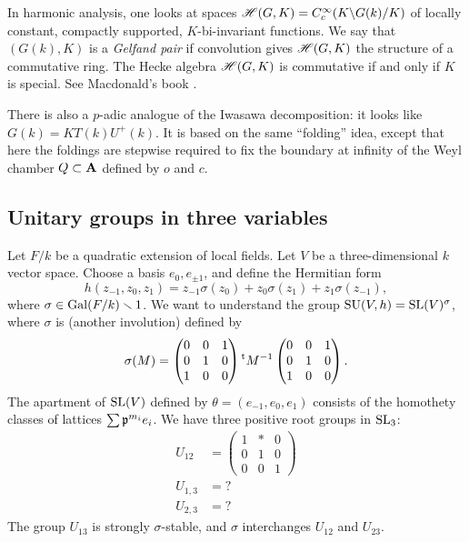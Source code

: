 In harmonic analysis, one looks at spaces 
$\mathscr{H}(G,K)=C_c^\infty(K\backslash G(k)/K)$ of locally constant, compactly supported, 
$K$-bi-invariant functions. We say that $(G(k),K)$ is a \emph{Gelfand pair} if 
convolution gives $\mathscr{H}(G,K)$ the structure of a commutative ring. The Hecke 
algebra $\mathscr{H}(G,K)$ is commutative if and only if $K$ is special. 
See Macdonald's book \cite{m71}. 

There is also a $p$-adic analogue of the Iwasawa decomposition: it looks like 
$G(k)= K T(k) U^+(k)$. It is based on the same ``folding'' idea, except that 
here the foldings are stepwise required to fix the boundary at infinity of the Weyl 
chamber $Q\subset \mathbf{A}$ defined by $o$ and $c$. 




\subsection{Unitary groups in three variables}

Let $F/k$ be a quadratic extension of local fields. Let $V$ be a three-dimensional 
$k$ vector space. Choose a basis $e_0,e_{\pm 1}$, and define the Hermitian form 
\[
  h(z_{-1},z_0,z_1) = z_{-1} \sigma(z_0) + z_0 \sigma(z_1) + z_1 \sigma(z_{-1}) ,
\]
where $\sigma\in \operatorname{Gal}(F/k)\smallsetminus 1$. We want to understand the 
group $\operatorname{SU}(V,h) = \operatorname{SL}(V)^\sigma$, where $\sigma$ is 
(another involution) defined by 
\[
  \sigma(M) = \begin{pmatrix} 0 & 0 & 1 \\ 0 & 1 & 0 \\ 1 & 0 & 0\end{pmatrix} \prescript{\mathrm{t}}{}{M}^{-1} \begin{pmatrix} 0 & 0 & 1 \\ 0 & 1 & 0 \\ 1 & 0 & 0\end{pmatrix} .
\]
The apartment of $\operatorname{SL}(V)$ defined by $\theta=(e_{-1},e_0,e_1)$ consists 
of the homothety classes of lattices $\sum \mathfrak{p}^{m_i} e_i$. We have three positive 
root groups in $\operatorname{SL}_3$: 
\begin{align*}
  U_{1 2} &= \begin{pmatrix} 1 & \ast & 0 \\ 0 & 1 & 0 \\ 0 & 0 & 1 \end{pmatrix} \\
  U_{1,3} &= ?\\
  U_{2,3} &= ?
\end{align*}
The group $U_{1 3}$ is strongly $\sigma$-stable, and $\sigma$ interchanges 
$U_{1 2}$ and $U_{2 3}$. 

